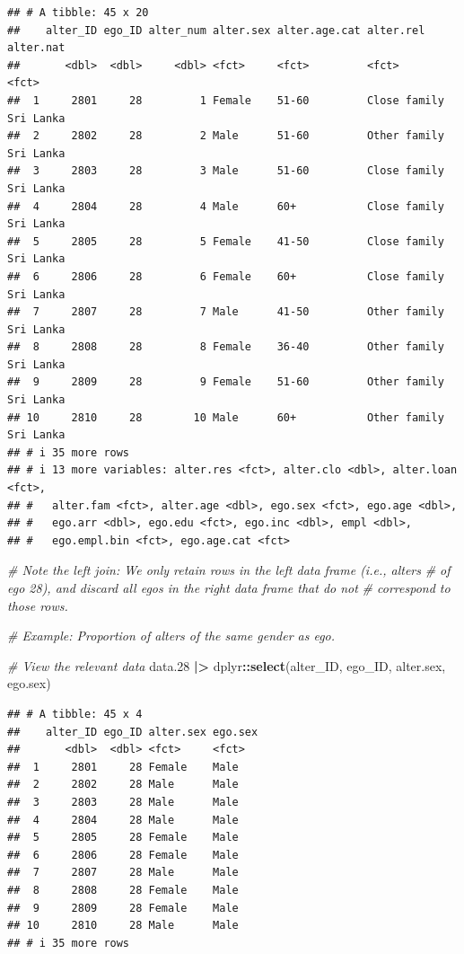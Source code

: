 \documentclass[
]{book}
\newenvironment{Shaded}{\begin{snugshade}}{\end{snugshade}}
\newcommand{\CommentTok}[1]{\textcolor[rgb]{0.56,0.35,0.01}{\textit{#1}}}
\newcommand{\FloatTok}[1]{\textcolor[rgb]{0.00,0.00,0.81}{#1}}
\newcommand{\FunctionTok}[1]{\textcolor[rgb]{0.13,0.29,0.53}{\textbf{#1}}}
\newcommand{\NormalTok}[1]{#1}
\newcommand{\SpecialCharTok}[1]{\textcolor[rgb]{0.81,0.36,0.00}{\textbf{#1}}}
\begin{document}
\begin{verbatim}
## # A tibble: 45 x 20
##    alter_ID ego_ID alter_num alter.sex alter.age.cat alter.rel    alter.nat
##       <dbl>  <dbl>     <dbl> <fct>     <fct>         <fct>        <fct>    
##  1     2801     28         1 Female    51-60         Close family Sri Lanka
##  2     2802     28         2 Male      51-60         Other family Sri Lanka
##  3     2803     28         3 Male      51-60         Close family Sri Lanka
##  4     2804     28         4 Male      60+           Close family Sri Lanka
##  5     2805     28         5 Female    41-50         Close family Sri Lanka
##  6     2806     28         6 Female    60+           Close family Sri Lanka
##  7     2807     28         7 Male      41-50         Other family Sri Lanka
##  8     2808     28         8 Female    36-40         Other family Sri Lanka
##  9     2809     28         9 Female    51-60         Other family Sri Lanka
## 10     2810     28        10 Male      60+           Other family Sri Lanka
## # i 35 more rows
## # i 13 more variables: alter.res <fct>, alter.clo <dbl>, alter.loan <fct>,
## #   alter.fam <fct>, alter.age <dbl>, ego.sex <fct>, ego.age <dbl>,
## #   ego.arr <dbl>, ego.edu <fct>, ego.inc <dbl>, empl <dbl>,
## #   ego.empl.bin <fct>, ego.age.cat <fct>
\end{verbatim}

\begin{Shaded}
\begin{Highlighting}[]
\CommentTok{\# Note the left join: We only retain rows in the left data frame (i.e., alters}
\CommentTok{\# of ego 28), and discard all egos in the right data frame that do not}
\CommentTok{\# correspond to those rows.}

\CommentTok{\# Example: Proportion of alters of the same gender as ego.}

\CommentTok{\# View the relevant data}
\NormalTok{data}\FloatTok{.28} \SpecialCharTok{|\textgreater{}} 
\NormalTok{  dplyr}\SpecialCharTok{::}\FunctionTok{select}\NormalTok{(alter\_ID, ego\_ID, alter.sex, ego.sex)}
\end{Highlighting}
\end{Shaded}

\begin{verbatim}
## # A tibble: 45 x 4
##    alter_ID ego_ID alter.sex ego.sex
##       <dbl>  <dbl> <fct>     <fct>  
##  1     2801     28 Female    Male   
##  2     2802     28 Male      Male   
##  3     2803     28 Male      Male   
##  4     2804     28 Male      Male   
##  5     2805     28 Female    Male   
##  6     2806     28 Female    Male   
##  7     2807     28 Male      Male   
##  8     2808     28 Female    Male   
##  9     2809     28 Female    Male   
## 10     2810     28 Male      Male   
## # i 35 more rows
\end{verbatim}
\end{document}
